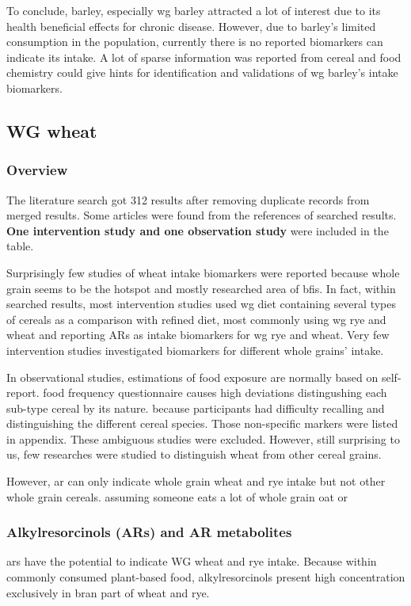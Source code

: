 To conclude, barley, especially \acrshort{wg} barley attracted a lot of interest due to its health beneficial effects for chronic disease. However, due to barley's limited consumption in the population, currently there is no reported biomarkers can indicate its intake. A lot of sparse information was reported from cereal and food chemistry could give hints for identification and validations of \acrshort{wg} barley's intake biomarkers.

\subsection{WG wheat}
\subsubsection{Overview}
The literature search got 312 results after removing duplicate records from merged results. Some articles were found from the references of searched results. 
\textbf{One intervention study and one observation study} %
were included in the table. 

Surprisingly few studies of wheat intake biomarkers were reported because whole grain seems to be the hotspot and mostly researched area of \acrshort{bfis}. 
In fact, within searched results, most intervention studies used \acrshort{wg} diet containing several types of cereals as a comparison with refined diet, most commonly using \acrshort{wg} rye and wheat and reporting ARs as intake biomarkers for \acrshort{wg} rye and wheat. Very few intervention studies investigated biomarkers for different whole grains' intake. 

In observational studies, estimations of food exposure are normally based on self-report.
food frequency questionnaire causes high deviations distingushing each sub-type cereal by its nature. 
because participants had difficulty recalling and distinguishing the different cereal species.
Those non-specific markers were listed in appendix. 
These ambiguous studies were excluded.
However, still surprising to us, few researches were studied to distinguish wheat from other cereal grains.

However, ar can only indicate whole grain wheat and rye intake but not other whole grain cereals. assuming someone eats a lot of whole grain oat or 


\subsubsection{Alkylresorcinols (ARs) and AR metabolites}
\acrfull{ars} have the potential to indicate WG wheat and rye intake. 
Because within commonly consumed plant-based food, alkylresorcinols present high concentration exclusively in bran part of wheat and rye. 


